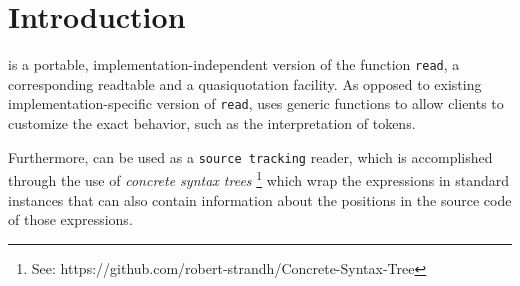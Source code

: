 \chapter{Introduction}

\sysname{} is a portable, implementation-independent version of the
\commonlisp{} function \texttt{read}, a corresponding readtable and a
quasiquotation facility.  As opposed to existing
implementation-specific version of \texttt{read}, \sysname{} uses
generic functions to allow clients to customize the exact behavior,
such as the interpretation of tokens.

Furthermore, \sysname{} can be used as a \texttt{source tracking}
reader, which is accomplished through the use of \emph{concrete syntax
  trees}%
\footnote{See: https://github.com/robert-strandh/Concrete-Syntax-Tree}
which wrap the \commonlisp{} expressions in standard instances that
can also contain information about the positions in the source code of
those expressions.
